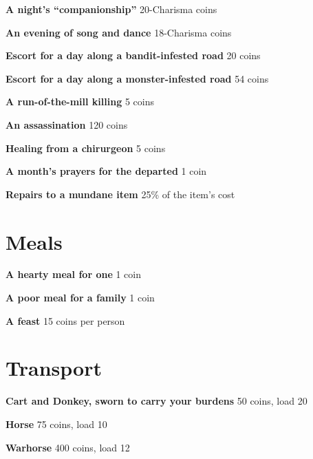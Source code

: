 {\noindent \bfseries A night's ``companionship''} \hspace*{\fill} 20-Charisma coins

{\noindent \bfseries An evening of song and dance} \hspace*{\fill} 18-Charisma coins

{\noindent \bfseries Escort for a day along a bandit-infested road} \hspace*{\fill} 20 coins

{\noindent \bfseries Escort for a day along a monster-infested road} \hspace*{\fill} 54 coins

{\noindent \bfseries A run-of-the-mill killing} \hspace*{\fill} 5 coins

{\noindent \bfseries An assassination} \hspace*{\fill} 120 coins

{\noindent \bfseries Healing from a chirurgeon} \hspace*{\fill} 5 coins

{\noindent \bfseries A month's prayers for the departed} \hspace*{\fill} 1 coin

{\noindent \bfseries Repairs to a mundane item} \hspace*{\fill} 25\% of the item's cost
\section*{Meals}

{\noindent \bfseries A hearty meal for one} \hspace*{\fill} 1 coin

{\noindent \bfseries A poor meal for a family} \hspace*{\fill} 1 coin

{\noindent \bfseries A feast} \hspace*{\fill} 15 coins per person
\section*{Transport}

{\noindent \bfseries Cart and Donkey, sworn to carry your burdens} \hspace*{\fill} 50 coins, load 20

{\noindent \bfseries Horse} \hspace*{\fill} 75 coins, load 10

{\noindent \bfseries Warhorse} \hspace*{\fill} 400 coins, load 12

